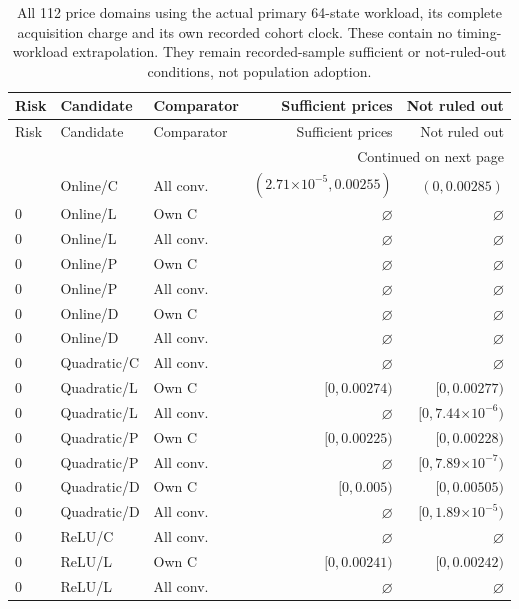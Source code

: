 \begingroup
\scriptsize
\setlength{\tabcolsep}{3pt}
\begin{longtable}{lllrr}
\caption{All 112 price domains using the actual primary 64-state workload, its complete acquisition charge and its own recorded cohort clock. These contain no timing-workload extrapolation. They remain recorded-sample sufficient or not-ruled-out conditions, not population adoption.}\label{tab:actualprices120}\\
\toprule
Risk & Candidate & Comparator & Sufficient prices & Not ruled out \\ \midrule
\endfirsthead
\toprule
Risk & Candidate & Comparator & Sufficient prices & Not ruled out \\ \midrule
\endhead
\midrule\multicolumn{5}{r}{Continued on next page}\\\endfoot
\bottomrule\endlastfoot
0 & Online/C & All conv. & $(2.71\mathord{\times}10^{-5}, 0.00255)$ & $(0, 0.00285)$ \\
0 & Online/L & Own C & $\varnothing$ & $\varnothing$ \\
0 & Online/L & All conv. & $\varnothing$ & $\varnothing$ \\
0 & Online/P & Own C & $\varnothing$ & $\varnothing$ \\
0 & Online/P & All conv. & $\varnothing$ & $\varnothing$ \\
0 & Online/D & Own C & $\varnothing$ & $\varnothing$ \\
0 & Online/D & All conv. & $\varnothing$ & $\varnothing$ \\
0 & Quadratic/C & All conv. & $\varnothing$ & $\varnothing$ \\
0 & Quadratic/L & Own C & $[0, 0.00274)$ & $[0, 0.00277)$ \\
0 & Quadratic/L & All conv. & $\varnothing$ & $[0, 7.44\mathord{\times}10^{-6})$ \\
0 & Quadratic/P & Own C & $[0, 0.00225)$ & $[0, 0.00228)$ \\
0 & Quadratic/P & All conv. & $\varnothing$ & $[0, 7.89\mathord{\times}10^{-7})$ \\
0 & Quadratic/D & Own C & $[0, 0.005)$ & $[0, 0.00505)$ \\
0 & Quadratic/D & All conv. & $\varnothing$ & $[0, 1.89\mathord{\times}10^{-5})$ \\
0 & ReLU/C & All conv. & $\varnothing$ & $\varnothing$ \\
0 & ReLU/L & Own C & $[0, 0.00241)$ & $[0, 0.00242)$ \\
0 & ReLU/L & All conv. & $\varnothing$ & $\varnothing$ \\

\end{longtable}
